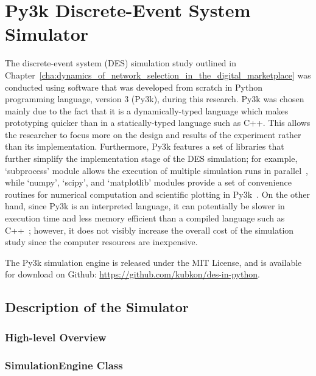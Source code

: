 \chapter{Py3k Discrete-Event System Simulator}
\label{cha:py3k_discrete_event_system_simulator}

\minitoc
\vspace{10mm}

The discrete-event system (DES) simulation study outlined in Chapter~\ref{cha:dynamics_of_network_selection_in_the_digital_marketplace} was conducted using software that was developed from scratch in Python programming language, version 3 (Py3k), during this research. Py3k was chosen mainly due to the fact that it is a dynamically-typed language which makes prototyping quicker than in a statically-typed language such as C++. This allows the researcher to focus more on the design and results of the experiment rather than its implementation. Furthermore, Py3k features a set of libraries that further simplify the implementation stage of the DES simulation; for example, `subprocess' module allows the execution of multiple simulation runs in parallel~\cite{Py3kSubprocess}, while `numpy', `scipy', and `matplotlib' modules provide a set of convenience routines for numerical computation and scientific plotting in Py3k~\cite{Numpy, Scipy, Matplotlib}. On the other hand, since Py3k is an interpreted language, it can potentially be slower in execution time and less memory efficient than a compiled language such as C++~\cite{Py3kC++}; however, it does not visibly increase the overall cost of the simulation study since the computer resources are inexpensive.

The Py3k simulation engine is released under the MIT License, and is available for download on Github: \url{https://github.com/kubkon/des-in-python}.

\section{Description of the Simulator}
\label{sec:description_of_the_simulator_simappendix}

\subsection{High-level Overview}
\label{sub:high_level_overview_simappendix}

\subsection{SimulationEngine Class}
\label{sub:simulationengine_class_simappendix}

